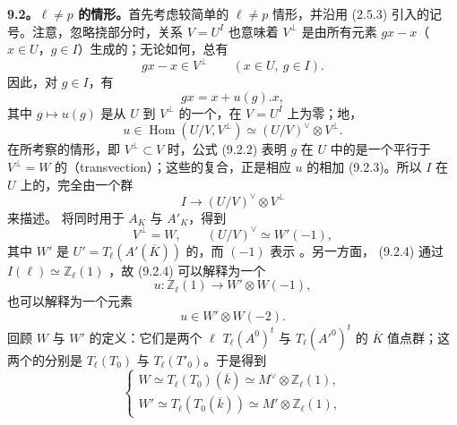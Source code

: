 \textbf{9.2。$\ell\ne p$ 的情形。}首先考虑较简单的 $\ell\ne p$ 情形，并沿用 (2.5.3) 引入的记号。注意，忽略挠部分时，关系 $V=U^I$ 也意味着 $V^\perp$ 是由所有元素 $gx-x$（$x\in U$，$g\in I$）生成的；无论如何，总有
\begin{equation}\tag{9.2.1}
 gx-x\in V^\perp\qquad(x\in U,\ g\in I).
\end{equation}
因此，对 $g\in I$，有
\begin{equation}\tag{9.2.2}
 gx=x+u(g).x,
\end{equation}
其中 $g\mapsto u(g)$ 是从 $U$ 到 $V^\perp$ 的一个，在 $V=U^I$ 上为零；地，
\begin{equation}\tag{9.2.3}
 u\in\operatorname{Hom}(U/V,V^\perp)\simeq(U/V)^\vee\otimes V^\perp.
\end{equation}
在所考察的情形，即 $V^\perp\subset V$ 时，公式 (9.2.2) 表明 $g$ 在 $U$ 中的是一个平行于 $V^\perp=W$ 的（transvection）；这些的复合，正是相应 $u$ 的相加 (9.2.3)。所以 $I$ 在 $U$ 上的，完全由一个群
\begin{equation}\tag{9.2.4}
 I\longrightarrow(U/V)^\vee\otimes V^\perp
\end{equation}
来描述。
将同时用于 $A_K$ 与 $A'_K$，得到
\[
 V^\perp=W,\qquad (U/V)^\vee\simeq W'(-1),
\]
其中 $W'$ 是 $U'=T_\ell(A'(\overline K))$ 的，而 $(-1)$ 表示 。另一方面， (9.2.4) 通过 $I(\ell)\simeq\mathbb Z_\ell(1)$ ，故 (9.2.4) 可以解释为一个
\begin{equation}\tag{9.2.5}
 u:\mathbb Z_\ell(1)\longrightarrow W'\otimes W(-1),
\end{equation}
也可以解释为一个元素
\begin{equation}\tag{9.2.6}
 u\in W'\otimes W(-2).
\end{equation}
回顾 $W$ 与 $W'$ 的定义：它们是两个 $\ell$  $T_\ell(A^0)^t$ 与 $T_\ell(A'^0)^t$ 的 $\overline K$ 值点群；这两个的分别是 $T_\ell(T_0)$ 与 $T_\ell(T'_0)$。于是得到
\begin{equation}\tag{9.2.7}
 \begin{cases}
 W\simeq T_\ell(T_0)(\overline k)\simeq M^\vee\otimes\mathbb Z_\ell(1),\\[4pt]
 W'\simeq T_\ell(T_0(\overline k))\simeq M'\otimes\mathbb Z_\ell(1),
 \end{cases}
\end{equation}

